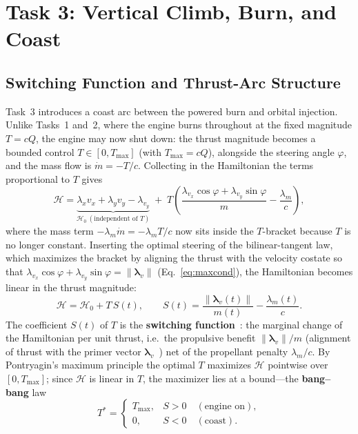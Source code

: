 \documentclass[../main.tex]{subfiles}
\begin{document}
\section{Task 3: Vertical Climb, Burn, and Coast}\label{sec:task3}

\subsection{Switching Function and Thrust-Arc Structure}

Task~3 introduces a coast arc between the powered burn and orbital injection. Unlike Tasks~1 and~2, where the engine burns throughout at the fixed magnitude $T = cQ$, the engine may now shut down: the thrust magnitude becomes a bounded control $T \in [0, T_{\max}]$ (with $T_{\max} = cQ$), alongside the steering angle $\varphi$, and the mass flow is $\dot{m} = -T/c$. Collecting in the Hamiltonian the terms proportional to $T$ gives
\begin{equation}
    \mathcal{H} = \underbrace{\lambda_x v_x + \lambda_y v_y - \lambda_{v_y}}_{\mathcal{H}_0\ (\text{independent of } T)}
    \; + \; T\left(\frac{\lambda_{v_x}\cos\varphi + \lambda_{v_y}\sin\varphi}{m} - \frac{\lambda_m}{c}\right),
    \label{eq:H_grouped}
\end{equation}
where the mass term $-\lambda_m\dot{m} = -\lambda_m T/c$ now sits inside the $T$-bracket because $T$ is no longer constant. Inserting the optimal steering of the bilinear-tangent law, which maximizes the bracket by aligning the thrust with the velocity costate so that $\lambda_{v_x}\cos\varphi + \lambda_{v_y}\sin\varphi = \|\boldsymbol{\lambda}_v\|$ (Eq.~\ref{eq:maxcond}), the Hamiltonian becomes linear in the thrust magnitude:
\begin{equation}
    \mathcal{H} = \mathcal{H}_0 + T\,S(t), \qquad
    S(t) = \frac{\|\boldsymbol{\lambda}_v(t)\|}{m(t)} - \frac{\lambda_m(t)}{c}.
    \label{eq:switching}
\end{equation}
The coefficient $S(t)$ of $T$ is the \textbf{switching function}~\cite[Sec.~3.9]{bryson1975}: the marginal change of the Hamiltonian per unit thrust, i.e.\ the propulsive benefit $\|\boldsymbol{\lambda}_v\|/m$ (alignment of thrust with the primer vector $\boldsymbol{\lambda}_v$~\cite[Lecture~6]{dclvnotes}) net of the propellant penalty $\lambda_m/c$. By Pontryagin's maximum principle the optimal $T$ maximizes $\mathcal{H}$ pointwise over $[0, T_{\max}]$; since $\mathcal{H}$ is linear in $T$, the maximizer lies at a bound---the \textbf{bang--bang} law
\begin{equation}
    T^\ast = \begin{cases} T_{\max}, & S > 0 \quad(\text{engine on}),\\[2pt] 0,        & S < 0 \quad(\text{coast}). \end{cases}
    \label{eq:bangbang}
\end{equation}
\end{document}
